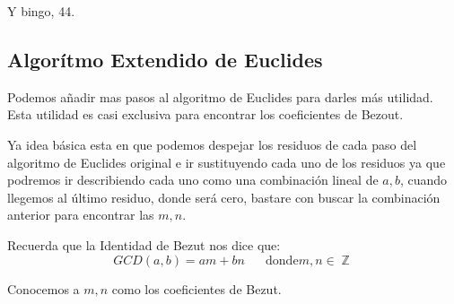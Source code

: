 \documentclass[12pt, fleqn]{report}                             %
\DeclareMathOperator \Space {\quad}                             %
\DeclareMathOperator \Integers  {\mathbb{Z}}                     %
\begin{document}
            Y bingo, 44.





        \clearpage
        \subsection{Algorítmo Extendido de Euclides}

            Podemos añadir mas pasos al algoritmo de Euclides para darles
            más utilidad. Esta utilidad es casi exclusiva para encontrar los
            coeficientes de Bezout.

            Ya idea básica esta en que podemos despejar los residuos de cada paso
            del algoritmo de Euclides original e ir sustituyendo cada uno de los residuos
            ya que podremos ir describiendo cada uno como una combinación lineal de $a,b$,
            cuando llegemos al último residuo, donde será cero, bastare con buscar la
            combinación anterior para encontrar las $m,n$.

            Recuerda que la Identidad de Bezut nos dice que:
            \begin{equation}
                GCD(a,b) = am +bn \Space \text{donde} m,n \in \Integers
            \end{equation}

            Conocemos a $m,n$ como los coeficientes de Bezut.
\end{document}
